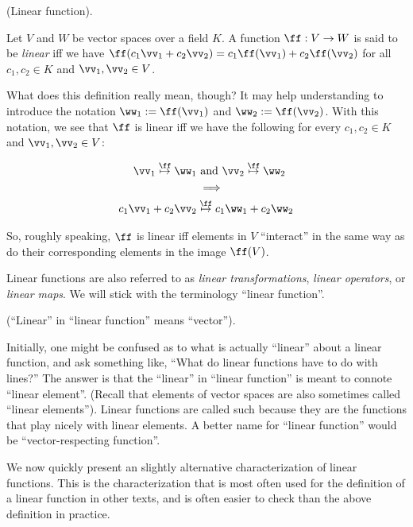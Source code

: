 \begin{defn}
\label{ch::lin_alg::defn::linear_function_intuitive}
    (Linear function). 
    
    Let $V$ and $W$ be vector spaces over a field $K$. A function $\ff:V \rightarrow W$ is said to be \textit{linear} iff we have $\ff(c_1 \vv_1 + c_2 \vv_2) = c_1 \ff(\vv_1) + c_2 \ff(\vv_2)$ for all $c_1, c_2 \in K$ and $\vv_1, \vv_2 \in V$.
    
    What does this definition really mean, though? It may help understanding to introduce the notation $\ww_1 := \ff(\vv_1)$ and $\ww_2 := \ff(\vv_2)$. With this notation, we see that $\ff$ is linear iff we have the following for every $c_1, c_2 \in K$ and $\vv_1, \vv_2 \in V$:
    
    \begin{align*}
        \vv_1 \overset{\ff}{\mapsto} \ww_1 &\text{ and } \vv_2 \overset{\ff}{\mapsto} \ww_2 \\
        &\implies \\
        c_1 \vv_1 + c_2 \vv_2 &\overset{\ff}{\mapsto} c_1 \ww_1 + c_2 \ww_2
    \end{align*}
    
    So, roughly speaking, $\ff$ is linear iff elements in $V$ ``interact'' in the same way as do their corresponding elements in the image $\ff(V)$.
    
    Linear functions are also referred to as \textit{linear transformations}, \textit{linear operators}, or \textit{linear maps}. We will stick with the terminology ``linear function''.
\end{defn}

\begin{remark}
\label{ch::lin_alg::rmk::linear_means_vector}
    (``Linear'' in ``linear function'' means ``vector'').
    
    Initially, one might be confused as to what is actually ``linear'' about a linear function, and ask something like, ``What do linear functions have to do with lines?'' The answer is that the ``linear'' in ``linear function'' is meant to connote ``linear element''. (Recall that elements of vector spaces are also sometimes called ``linear elements''). Linear functions are called such because they are the functions that play nicely with linear elements. A better name for ``linear function'' would be ``vector-respecting function''.
\end{remark}

We now quickly present an slightly alternative characterization of linear functions. This is the characterization that is most often used for the definition of a linear function in other texts, and is often easier to check than the above definition in practice.

